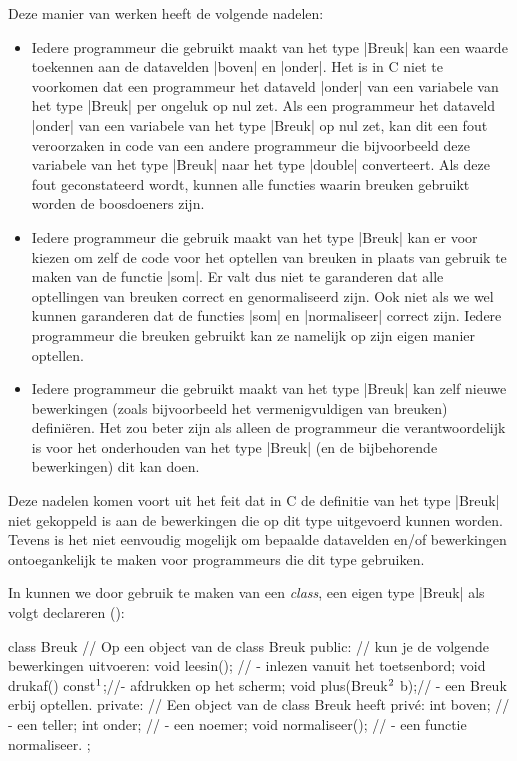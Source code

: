 \begin{cpplstShortInline}
Deze manier van werken heeft de volgende nadelen:
\begin{itemize}
    \item Iedere programmeur die gebruikt maakt van het type |Breuk| kan een waarde toekennen aan de datavelden |boven| en |onder|.
Het is in C niet te voorkomen dat een programmeur het dataveld |onder| van een variabele van het type |Breuk| per ongeluk op nul zet. 
Als een programmeur het dataveld |onder| van een variabele van het type  |Breuk| op nul zet, kan dit een fout veroorzaken in code van een andere programmeur die bijvoorbeeld deze variabele van het type |Breuk| naar het type |double| converteert.
Als deze fout geconstateerd wordt, kunnen alle functies waarin breuken gebruikt worden de boosdoeners zijn.
    \item Iedere programmeur die gebruik maakt van het type |Breuk| kan er voor kiezen om zelf de code voor het optellen van breuken  in plaats van gebruik te maken van de functie |som|.
Er valt dus niet te garanderen dat alle optellingen van breuken correct en genormaliseerd zijn.
Ook niet als we wel kunnen garanderen dat de functies |som| en |normaliseer| correct zijn.
Iedere programmeur die breuken gebruikt kan ze namelijk op zijn eigen manier optellen.
    \item Iedere programmeur die gebruikt maakt van het type |Breuk| kan zelf nieuwe bewerkingen (zoals bijvoorbeeld het vermenigvuldigen van breuken) definiëren.
Het zou beter zijn als alleen de programmeur die verantwoordelijk is voor het onderhouden van het type |Breuk| (en de bijbehorende bewerkingen) dit kan doen.
\end{itemize}
Deze nadelen komen voort uit het feit dat in C de definitie van het type |Breuk| niet gekoppeld is aan de bewerkingen die op dit type uitgevoerd kunnen worden.
Tevens is het niet eenvoudig mogelijk om bepaalde datavelden en/of bewerkingen ontoegankelijk te maken voor programmeurs die dit type gebruiken.

In \Cpp{} kunnen we door gebruik te maken van een {\it class\/}, een eigen type |Breuk| als volgt declareren ():
\begin{cpplstfragment}[mathescape=true]
$\label{breuk0}$class Breuk {           // Op een object van de class Breuk
public:                 // kun je de volgende bewerkingen uitvoeren:
    void leesin();      // -  inlezen vanuit het toetsenbord;
    void drukaf() const$%
        \footnotemark%
        \makeatletter%
        \global\let\saved@Href@A\Hy@footnote@currentHref%
        \makeatother%
        $;//-  afdrukken op het scherm;
    void plus(Breuk$%
        \label{better used const reference 1}%
        \footnotemark%
        \makeatletter%
        \global\let\saved@Href@B\Hy@footnote@currentHref%
        \makeatother%
        $ b);// -  een Breuk erbij optellen.
private:                // Een object van de class Breuk heeft privé:
    int boven;          // -  een teller;
    int onder;          // -  een noemer;
    void normaliseer(); // -  een functie normaliseer.
};
\end{cpplstfragment}


\end{cpplstShortInline}
